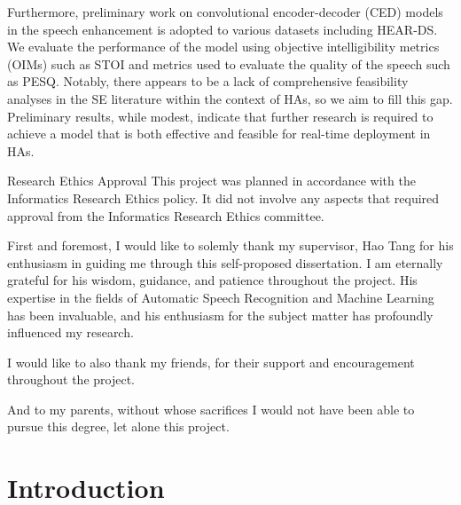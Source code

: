\documentclass[logo,bsc,singlespacing,parskip,online]{infthesis}
\begin{document}
\begin{preliminary}
{   Furthermore, preliminary work on convolutional encoder-decoder (CED) 
   models in the speech enhancement is adopted to various datasets 
   including HEAR-DS. We evaluate the performance of the model 
   using objective intelligibility metrics (OIMs) such as STOI and 
   metrics used to evaluate the quality of the speech such as PESQ. 
   Notably, there appears to be a lack of comprehensive feasibility analyses in 
   the SE literature within the context of HAs, so we aim to fill this gap. 
   Preliminary results, while modest, indicate that further research is required 
   to achieve a model that is both effective and feasible for real-time deployment in HAs.
}

\maketitle

\newenvironment{ethics}
   {\begin{frontenv}{Research Ethics Approval}{\LARGE}}
   {\end{frontenv}\newpage}

\begin{ethics}
This project was planned in accordance with the Informatics Research
Ethics policy. It did not involve any aspects that required approval
from the Informatics Research Ethics committee.

\standarddeclaration
\end{ethics}


\begin{acknowledgements}
First and foremost, I would like to solemly thank my supervisor, Hao Tang for 
his enthusiasm in guiding me through this self-proposed dissertation. I am eternally grateful for his wisdom, guidance, and patience throughout the project.
His expertise in the fields of Automatic Speech Recognition and Machine Learning has been invaluable, and his enthusiasm for the subject matter has profoundly influenced my research.

I would like to also thank my friends, for their support and encouragement throughout the project. 

And to my parents, without whose sacrifices I would not have been able to pursue this degree, let alone this project.
\end{acknowledgements}


\tableofcontents
\end{preliminary}


\chapter{Introduction}
\end{document}
